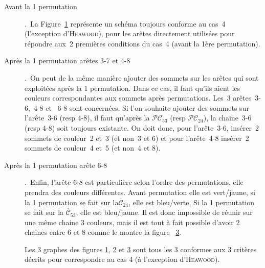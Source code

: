 \documentclass[french]{report}
\begin{document}
\begin{description}
\item [Avant la 1 permutation].\
La Figure~\ref{fig:cas4_ext1} représente un schéma toujours conforme au cas~4 (l’exception d'\textsc{Heawood}), pour les arêtes directement utilisées pour répondre aux~2 premières conditions du cas~4 (avant la 1ère permutation).
\begin{figure}[!ht]\centering
		
	\caption{}\label{fig:cas4_ext1}
\end{figure}
\FloatBarrier

\item [Après la 1 permutation arêtes 3-7 et 4-8].\
On peut de la même manière ajouter des sommets sur les arêtes qui sont exploitées après la 1 permutation. Dans ce cas, il faut qu’ils aient les couleurs correspondantes aux sommets après permutations. Les~3 arêtes~3-6,~4-8 et~ 6-8 sont concernées. Si l’on souhaite ajouter des sommets sur l’arête~3-6 (resp 4-8), il faut qu’après la $\mathcal{PC}_{53}$ (resp  $\mathcal{PC}_{24}$), la chaine~3-6 (resp 4-8) soit toujours existante. On doit donc, pour l’arête~3-6, insérer~2 sommets de couleur~2 et~3 (et non~3 et 6) et pour l’arête~4-8 insérer~2 sommets de couleur~4 et~5 (et non~4 et 8).
\begin{figure}[!ht]\centering
		
	\caption{}\label{fig:cas4_ext2}
\end{figure}
\FloatBarrier

\item [Après la 1 permutation arête 6-8].\
Enfin, l’arête 6-8 est particulière selon l’ordre des permutations, elle prendra des couleurs différentes.
Avant permutation elle est vert/jaune, si la 1 permutation se fait sur la$\overline{\mathcal{C}}_{24}$, elle est bleu/verte, Si la 1 permutation se fait sur la $\overline{\mathcal{C}}_{53}$, elle est bleu/jaune. Il est donc impossible de réunir sur une même chaine 3 couleurs, mais il est tout à fait possible d’avoir 2 chaines entre 6 et 8 comme le montre la figure ~\ref{fig:cas4_ext3}.
\begin{figure}[!ht]\centering
		
	\caption{}\label{fig:cas4_ext3}
\end{figure}
\FloatBarrier
Les 3 graphes des figures \ref{fig:cas4_ext1}, \ref{fig:cas4_ext2} et \ref{fig:cas4_ext3} sont tous les 3 conformes aux 3 critères décrits pour correspondre au cas 4 (à l’exception d'\textsc{Heawood}).\\
\end{description}
\end{document}
